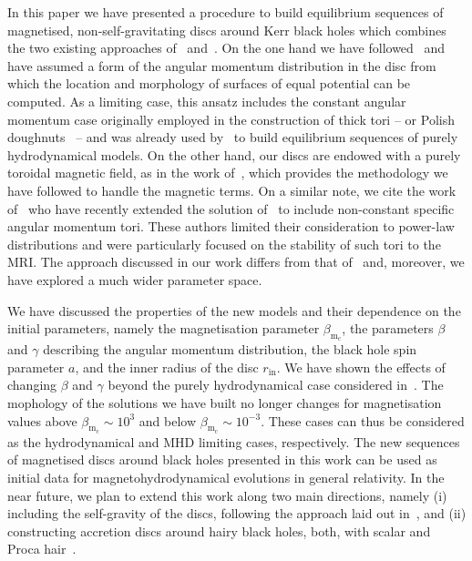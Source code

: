 \documentclass[]{aa}
\begin{document}
In this paper we have presented a procedure to build equilibrium sequences of magnetised, non-self-gravitating discs around Kerr black holes which combines the two existing approaches of~\citet{Komissarov:2006} and~\citet{Qian:2009}. On the one hand we have followed~\citet{Qian:2009} and have assumed a form of the angular momentum distribution in the disc from which the location and morphology of surfaces of equal potential can be computed. As a limiting case, this ansatz includes the constant angular momentum case originally employed in the construction of thick tori -- or Polish doughnuts~\citep{Abramowicz:1978,Kozlowski:1978}  -- and was already used by~\citet{Qian:2009} to build equilibrium sequences of purely hydrodynamical models. On the other hand, our discs are endowed with a purely toroidal magnetic field, as in the work of~\citet{Komissarov:2006}, which provides the methodology we have followed to handle the magnetic terms. On a similar note, we cite the work of~\citet{Wielgus:2015} who have recently extended the solution of~\citet{Komissarov:2006} to include non-constant specific angular momentum tori. These authors  limited their consideration to power-law distributions and were particularly focused on the stability of such tori to the MRI. The approach discussed in our work differs from that of~\citet{Wielgus:2015} and, moreover, we have explored a much wider parameter space.

We have discussed the properties of the new models and their dependence on the initial parameters, namely the magnetisation parameter $\beta_{\mathrm{m}_{\mathrm{c}}}$, the parameters $\beta$ and $\gamma$ describing the angular momentum distribution, the black hole spin parameter $a$, and the inner radius of the disc $r_{\mathrm{in}}$. We have shown the effects of changing $\beta$ and $\gamma$ beyond the purely hydrodynamical case considered in~\citet{Qian:2009}. The mophology of the solutions we have built no longer changes for magnetisation values above $\beta_{\mathrm{m}_{\mathrm{c}}} \sim 10^{3}$ and below $\beta_{\mathrm{m}_{\mathrm{c}}} \sim 10^{-3}$. These cases can thus be considered as the hydrodynamical and MHD limiting cases, respectively. The new sequences of magnetised discs around black holes presented in this work can be used as initial data for magnetohydrodynamical evolutions in general relativity. In the near future, we plan to extend this work along two main directions, namely (i) including the self-gravity of the discs, following the approach laid out in~\citet{Stergioulas:2011}, and (ii) constructing accretion discs around hairy black holes, both, with scalar and Proca hair~\citep{Herdeiro:2014,Herdeiro:2016}.
\end{document}
